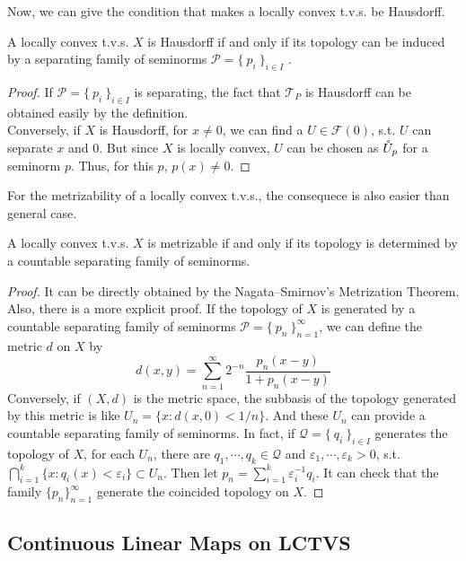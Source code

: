 \documentclass[a4paper,11pt]{report}
\begin{document}
Now, we can give the condition that makes a locally convex t.v.s. be Hausdorff.

\begin{thm} 
	A locally convex t.v.s. $X$ is Hausdorff if and only if its topology can be induced by a separating family of seminorms $\mathscr{P} = \{~p_i~\}_{i \in I}$ .
\end{thm}
\begin{proof}
	If $\mathscr{P} = \{~p_i~\}_{i \in I}$ is separating, the fact that $\mathscr{T}_P$ is Hausdorff can be obtained easily by the definition.\\
	Conversely, if $X$ is Hausdorff, for $x \neq 0$, we can find a $U \in \mathscr{F}(0)$, s.t. $U$ can separate $x$ and $0$. But since $X$ is locally convex, $U$ can be chosen as $\mathring{U}_p$ for a seminorm $p$. Thus, for this $p$, $p(x) \neq 0$.
\end{proof}

For the metrizability of a locally convex t.v.s., the consequece is also easier than general case.
\begin{thm} \label{thm4}
	A locally convex t.v.s. $X$ is metrizable if and only if its topology is determined by a countable separating family of seminorms.
\end{thm}
\begin{proof}
	It can be directly obtained by the Nagata–Smirnov's Metrization Theorem. Also, there is a more explicit proof. If the topology of $X$ is generated by a countable separating family of seminorms $\mathscr{P} = \{~p_n~\}_{n=1}^{\infty}$, we can define the metric $d$ on $X$ by
	\begin{equation*}
		d(x,y) = \sum_{n=1}^{\infty} 2^{-n} \frac{p_n(x-y)}{1+p_n(x-y)}
	\end{equation*} 
	Conversely, if $(X,d)$ is the metric space, the subbasis of the topology generated by this metric is like $U_n = \{x \colon d(x,0) < 1/n\}$. And these $U_n$ can provide a countable separating family of seminorms. In fact, if $\mathscr{Q} = \{~q_i~\}_{i \in I}$ generates the topology of $X$, for each $U_n$, there are $q_1,\cdots,q_k \in \mathscr{Q}$ and $\varepsilon_1,\cdots,\varepsilon_k > 0$, s.t. $\bigcap_{i=1}^{k} \{x \colon q_i(x) < \varepsilon_i\} \subset U_n$. Then let $p_n = \sum_{i=1}^{k} \varepsilon_i^{-1}q_i$. It can check that the family $\{p_n\}_{n=1}^{\infty}$ generate the coincided topology on $X$.
\end{proof}

\subsection{Continuous Linear Maps on LCTVS}
\end{document}
